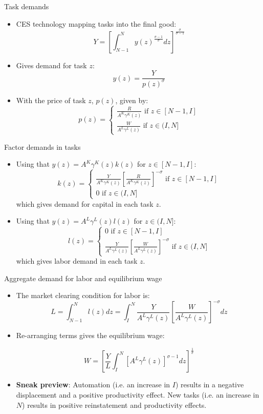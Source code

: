 \documentclass[notes=show]{beamer}
\begin{document}
\begin{frame}{Task demands}
\begin{itemize}
\item CES technology mapping tasks into the final good:
\[
Y= \left[ \int_{N-1}^{N} y(z)^{\frac{\sigma-1}{\sigma}}dz \right]^{\frac{\sigma}{\sigma-1}} \tag{A1}  \label{eqA1}
\]
\item Gives demand for task $z$:
\[
y(z) = \frac{Y}{p(z)^{\sigma}}
\]
\item With the price of task $z$, $p(z)$, given by:
\[
p(z) = 
\begin{cases}
\frac{R}{A^{K} \gamma^{K}(z)} \text{ if } z \in [N-1,I] \\
\frac{W}{A^{L} \gamma^{L}(z)} \text{ if } z \in (I,N] 
\end{cases}
\]
\end{itemize}
\end{frame}

\begin{frame}{Factor demands in tasks}
\begin{itemize}
\item Using that $y(z) = A^{K} \gamma^{K}(z)k(z)$ for $z \in [N-1,I]$:
\[
k(z)=
\begin{cases}
\frac{Y}{A^{K}\gamma^{K}(z)} \left[ \frac{R}{A^{K}\gamma^{K}(z)} \right]^{- \sigma} \text{ if } z \in [N-1,I] \\
0 \text{ if } z \in (I,N]
\end{cases}
\]
which gives demand for capital in each task $z$. \medskip
\item Using that $y(z) = A^{L} \gamma^{L}(z)l(z)$ for $z \in (I,N]$:
\[
l(z)=
\begin{cases}
0 \text{ if } z \in [N-1,I] \\
\frac{Y}{A^{L}\gamma^{L}(z)} \left[ \frac{W}{A^{L}\gamma^{L}(z)} \right]^{- \sigma}  \text{ if } z \in (I,N]
\end{cases}
\]
which gives labor demand in each task $z$.
\end{itemize}
\end{frame}

\begin{frame}{Aggregate demand for labor and equilibrium wage}
\begin{itemize}
\item The market clearing condition for labor is:
\[
L = \int_{N-1}^{N} l(z)dz =  \int_{I}^{N} \frac{Y}{A^{L}\gamma^{L}(z)} \left[ \frac{W}{A^{L}\gamma^{L}(z)} \right]^{- \sigma} dz
\]
\item Re-arranging terms gives the equilibrium wage:
\begin{tcolorbox}
\[
W = \left[ \frac{Y}{L} \int_{I}^{N} [A^{L}\gamma^{L}(z)]^{\sigma-1} dz \right]^{\frac{1}{\sigma}}
\]
\end{tcolorbox}
\item \textbf{Sneak preview}: Automation (i.e. an increase in $I$) results in a negative displacement and a positive productivity effect. New tasks (i.e. an increase in $N$) results in positive reinstatement and productivity effects.  
\end{itemize}
\end{frame}
\end{document}
